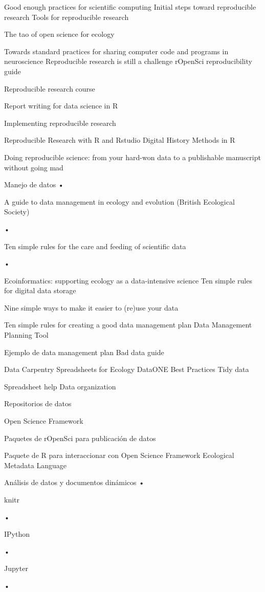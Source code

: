 \documentclass[]{tufte-handout}
\begin{document}
Good enough practices for scientific computing Initial steps toward
reproducible research Tools for reproducible research

The tao of open science for ecology

Towards standard practices for sharing computer code and programs in
neuroscience Reproducible research is still a challenge rOpenSci
reproducibility guide

Reproducible research course

Report writing for data science in R

Implementing reproducible research

Reproducible Research with R and Rstudio Digital History Methods in R

Doing reproducible science: from your hard-won data to a publishable
manuscript without going mad

Manejo de datos •

A guide to data management in ecology and evolution (British Ecological
Society)

•

Ten simple rules for the care and feeding of scientific data

•

Ecoinformatics: supporting ecology as a data-intensive science Ten
simple rules for digital data storage

Nine simple ways to make it easier to (re)use your data

Ten simple rules for creating a good data management plan Data
Management Planning Tool

Ejemplo de data management plan Bad data guide

Data Carpentry Spreadsheets for Ecology DataONE Best Practices Tidy data

Spreadsheet help Data organization

Repositorios de datos

Open Science Framework

Paquetes de rOpenSci para publicación de datos

Paquete de R para interaccionar con Open Science Framework Ecological
Metadata Language

Análisis de datos y documentos dinámicos •

knitr

•

IPython

•

Jupyter

•
\end{document}
